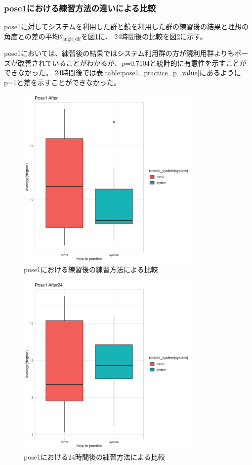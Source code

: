     \subsubsection{pose1における練習方法の違いによる比較}
      pose1に対してシステムを利用した群と鏡を利用した群の練習後の結果と理想の角度との差の平均\(\bar{\theta}_{\text{angle\_dif}}\)を図\ref{fig:pose1_after_practice}に、
      24時間後の比較を図\ref{fig:pose1_after24_practice}に示す。

      pose1においては、練習後の結果ではシステム利用群の方が鏡利用群よりもポーズが改善されていることがわかるが、p=0.7104と統計的に有意性を示すことができなかった。
      24時間後では表\ref{table:pose1_practice_p_value}にあるようにp=1と差を示すことができなかった。
      \begin{figure}[H]
        \begin{center}
        \includegraphics[width=9cm]{figures/pose1_after_boxplot.png}
        \caption{pose1における練習後の練習方法による比較}
        \label{fig:pose1_after_practice}
        \end{center}
      \end{figure}

      \begin{figure}[H]
        \begin{center}
        \includegraphics[width=9cm]{figures/pose1_after24_boxplot.png}
        \caption{pose1における24時間後の練習方法による比較}
        \label{fig:pose1_after24_practice}
        \end{center}
      \end{figure}

